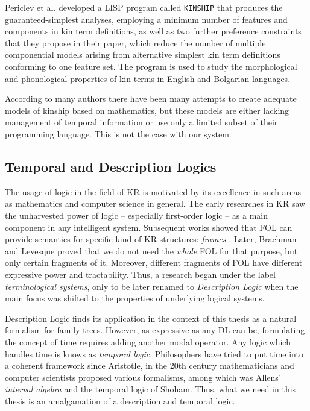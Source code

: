 Periclev et al. developed\cite{vlad} a LISP program called \texttt{KINSHIP} that produces the guaranteed-simplest analyses,
employing a minimum number of features and components in kin term definitions, as well as two further preference constraints that
they propose in their paper, which reduce the number of multiple componential models arising from alternative simplest kin term
definitions conforming to one feature set. The program is used to study the morphological and phonological properties of kin terms
in English and Bolgarian languages.

According to many authors\cite{read} \cite{vlad} there have been many attempts to create adequate models of kinship based on
mathematics, but these models are either lacking management of temporal information or use only a limited subset of their
programming language. This is not the case with our system.

\subsection{Temporal and Description Logics}
The usage of logic in the field of KR is motivated by its excellence in such areas as mathematics and computer science in general.
The early researches in KR saw the unharvested power of logic -- especially first-order logic -- as a main component in any
intelligent system. Subsequent works showed that FOL can provide semantics for specific kind of KR structures:
\textit{frames} \cite{frames}. Later, Brachman and Levesque proved \cite{krhyp} that we do not need the \textit{whole} FOL for that
purpose, but only certain fragments of it. Moreover, different fragments of FOL have different expressive power and tractability.
Thus, a research began under the label \textit{terminological systems}, only to be later renamed to
\textit{Description Logic} when the main focus was shifted to the properties of underlying logical systems.

Description Logic finds its application in the context of this thesis as a natural formalism for family trees. However, as
expressive as any DL can be, formulating the concept of time requires adding another modal operator. Any logic which handles time
is knows as \textit{temporal logic}. Philosophers have tried to put time into a coherent framework since Aristotle, in
the 20th century mathematicians and computer scientists proposed various formalisms, among which was Allens' \textit{interval
algebra}\cite{allen} and the temporal logic of Shoham\cite{shoh}. Thus, what we need in this thesis is an amalgamation of a
description and temporal logic.

